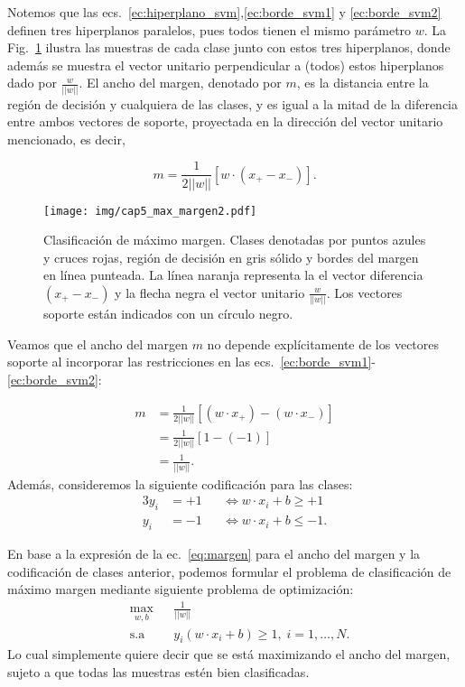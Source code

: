 Notemos que las ecs.~\eqref{ec:hiperplano_svm},\eqref{ec:borde_svm1} y \eqref{ec:borde_svm2} definen tres hiperplanos paralelos, pues todos tienen el mismo parámetro $w$. La Fig.~\ref{fig:clasif_margen} ilustra las muestras de cada clase junto con estos tres hiperplanos, donde además se muestra el vector unitario perpendicular a (todos) estos hiperplanos dado por $\frac{w}{||w||}$. El ancho del {margen}, denotado por $m$, es la distancia entre la región de decisión y cualquiera de las clases, y es igual a la mitad de la diferencia entre ambos vectores de soporte, proyectada en la dirección del vector unitario mencionado, es decir, 

\begin{equation}
 	m = \frac{1}{2||w||}[ w \cdot (x_{+} - x_{-})].
\end{equation} 

\begin{figure}[ht]
    \centering
    \texttt{[image: img/cap5\_max\_margen2.pdf]}
    \caption{Clasificación de máximo margen. Clases denotadas por puntos azules y cruces rojas, región de decisión en gris sólido y bordes del margen en línea punteada. La línea naranja representa la  el vector diferencia $(x_+ - x_{-})$ y la flecha negra el vector unitario $\frac{w}{||w||}$. Los vectores soporte están indicados con un círculo negro.}
    \label{fig:clasif_margen}
\end{figure}

Veamos que el ancho del margen $m$ no depende explícitamente de los vectores soporte al incorporar las restricciones en las ecs.~\eqref{ec:borde_svm1}-\eqref{ec:borde_svm2}:

\begin{align}
    m &= \frac{1}{2||w||} [ (w\cdot x_{+}) - (w\cdot x_{-})]\nonumber\\
    &= \frac{1}{2||w||} [1 - (-1)]\nonumber\\
    &= \frac{1}{||w||}.\label{eq:margen}
\end{align}
Además, consideremos la siguiente codificación para las clases:
\begin{alignat}{3}
    y_i&=+1 &&\Leftrightarrow w\cdot x_i + b \geq +1 \label{eq:codif_svm1}\\
    y_i &=-1 &&\Leftrightarrow w\cdot x_i + b \leq -1.\label{eq:codif_svm2}
 \end{alignat}

En base a la expresión de la ec.~\eqref{eq:margen} para el ancho del margen y la codificación de clases anterior, podemos formular el problema de clasificación de máximo margen mediante  siguiente problema de optimización:
\begin{equation*}
\begin{aligned}
& \underset{w,b}{\text{max}}
& & \frac{1}{||w||}\\
& \text{s.a}
& & y_i (w\cdot x_i +b) \geq 1, \; i = 1, \ldots, N.
\end{aligned}
\end{equation*}
Lo cual simplemente quiere decir que se está maximizando el ancho del margen, sujeto a que todas las muestras estén bien clasificadas. 

